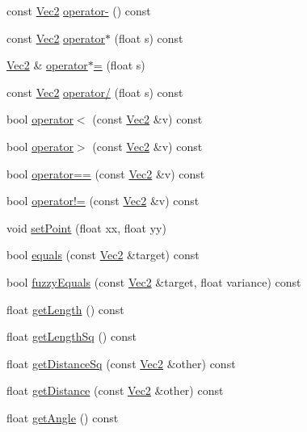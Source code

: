 \begin{DoxyCompactItemize}
\item 
const \hyperlink{classVec2}{Vec2} \hyperlink{classVec2_ae96b9fc7ac393b36eae80d141d9f8819}{operator-\/} () const
\item 
const \hyperlink{classVec2}{Vec2} \hyperlink{classVec2_aac30b50a35381a11b76b89ea19dc7f12}{operator$\ast$} (float s) const
\item 
\hyperlink{classVec2}{Vec2} \& \hyperlink{classVec2_a9ab811215385bea7bb254b12cc9665af}{operator$\ast$=} (float s)
\item 
const \hyperlink{classVec2}{Vec2} \hyperlink{classVec2_a30794ad88645e3d0279e8253e4355e8d}{operator/} (float s) const
\item 
bool \hyperlink{classVec2_aad24b95fb51746343f06c504a7a05681}{operator$<$} (const \hyperlink{classVec2}{Vec2} \&v) const
\item 
bool \hyperlink{classVec2_a40d9c6d4290844d86f27cb76fb8a3556}{operator$>$} (const \hyperlink{classVec2}{Vec2} \&v) const
\item 
bool \hyperlink{classVec2_a08e7dcf7a04bd18d56d41dc03104ba64}{operator==} (const \hyperlink{classVec2}{Vec2} \&v) const
\item 
bool \hyperlink{classVec2_a7d0cfd297b55abcb15ff1137cde32edd}{operator!=} (const \hyperlink{classVec2}{Vec2} \&v) const
\item 
void \hyperlink{classVec2_a3bfb9fcb76dde6c03534f94906bb33fc}{set\+Point} (float xx, float yy)
\item 
bool \hyperlink{classVec2_a56fd3f594c7532a7ba84ea3473257671}{equals} (const \hyperlink{classVec2}{Vec2} \&target) const
\item 
bool \hyperlink{classVec2_a5ac04604789866d317ade8f4579b37a9}{fuzzy\+Equals} (const \hyperlink{classVec2}{Vec2} \&target, float variance) const
\item 
float \hyperlink{classVec2_ae486d0799b31a9831eef5a35164a4846}{get\+Length} () const
\item 
float \hyperlink{classVec2_a0b3f546ad8db551b9428d147318aee34}{get\+Length\+Sq} () const
\item 
float \hyperlink{classVec2_a5f2fee415aa806bdaad99e984cc991eb}{get\+Distance\+Sq} (const \hyperlink{classVec2}{Vec2} \&other) const
\item 
float \hyperlink{classVec2_a44c9c4de94d07758f73195088788ded4}{get\+Distance} (const \hyperlink{classVec2}{Vec2} \&other) const
\item 
float \hyperlink{classVec2_aaca24d4a0550be8892c4d84c7b37e027}{get\+Angle} () const
\item 

\end{DoxyCompactItemize}
